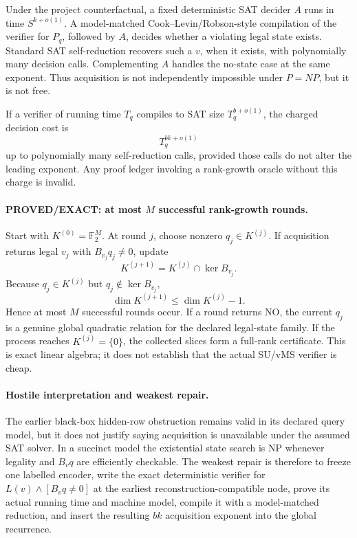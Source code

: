 \documentclass[11pt]{article}
\begin{document}
Under the project counterfactual, a fixed deterministic SAT decider $A$ runs in time $S^{k+o(1)}$. A model-matched Cook--Levin/Robson-style compilation of the verifier for $P_q$, followed by $A$, decides whether a violating legal state exists. Standard SAT self-reduction recovers such a $v$, when it exists, with polynomially many decision calls. Complementing $A$ handles the no-state case at the same exponent. Thus acquisition is not independently impossible under $P=NP$, but it is not free.

If a verifier of running time $T_q$ compiles to SAT size $T_q^{b+o(1)}$, the charged decision cost is
\[\boxed{T_q^{bk+o(1)}}\]
up to polynomially many self-reduction calls, provided those calls do not alter the leading exponent. Any proof ledger invoking a rank-growth oracle without this charge is invalid.

\paragraph{PROVED/EXACT: at most $M$ successful rank-growth rounds.} Start with $K^{(0)}=\mathbb F_2^M$. At round $j$, choose nonzero $q_j\in K^{(j)}$. If acquisition returns legal $v_j$ with $B_{v_j}q_j\neq0$, update
\[K^{(j+1)}=K^{(j)}\cap\ker B_{v_j}.\]
Because $q_j\in K^{(j)}$ but $q_j\notin\ker B_{v_j}$,
\[\dim K^{(j+1)}\le\dim K^{(j)}-1.\]
Hence at most $M$ successful rounds occur. If a round returns NO, the current $q_j$ is a genuine global quadratic relation for the declared legal-state family. If the process reaches $K^{(j)}=\{0\}$, the collected slices form a full-rank certificate. This is exact linear algebra; it does not establish that the actual SU/vMS verifier is cheap.

\paragraph{Hostile interpretation and weakest repair.} The earlier black-box hidden-row obstruction remains valid in its declared query model, but it does not justify saying acquisition is unavailable under the assumed SAT solver. In a succinct model the existential state search is NP whenever legality and $B_vq$ are efficiently checkable. The weakest repair is therefore to freeze one labelled encoder, write the exact deterministic verifier for $L(v)\wedge[B_vq\neq0]$ at the earliest reconstruction-compatible node, prove its actual running time and machine model, compile it with a model-matched reduction, and insert the resulting $bk$ acquisition exponent into the global recurrence.
\end{document}
